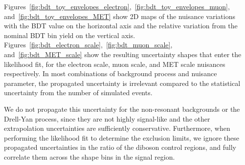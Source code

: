 Figures~\ref{fig:bdt_toy_envelopes_electron},~\ref{fig:bdt_toy_envelopes_muon}, and~\ref{fig:bdt_toy_envelopes_MET} show 2D maps of the nuisance variations with the BDT value on the horizontal axis and the relative variation from the nominal BDT bin yield on the vertical axis.
Figures~\ref{fig:bdt_electron_scale},~\ref{fig:bdt_muon_scale}, and~\ref{fig:bdt_MET_scale} show the resulting uncertainty shapes that enter the likelihood fit, for the electron scale, muon scale, and MET scale nuisances respectively. 
In most combinations of background process and nuisance parameter, the propagated uncertainty is irrelevant compared to the statistical uncertainty from the number of simulated events.

We do not propagate this uncertainty for the non-resonant backgrounds or the Drell-Yan process, 
since they are not highly signal-like and the other extrapolation uncertainties are sufficiently conservative.
Furthermore, when performing the likelihood fit to determine the exclusion limits, 
we ignore these propagated uncertainties in the ratio of the diboson control regions, 
and fully correlate them across the shape bins in the signal region. 

